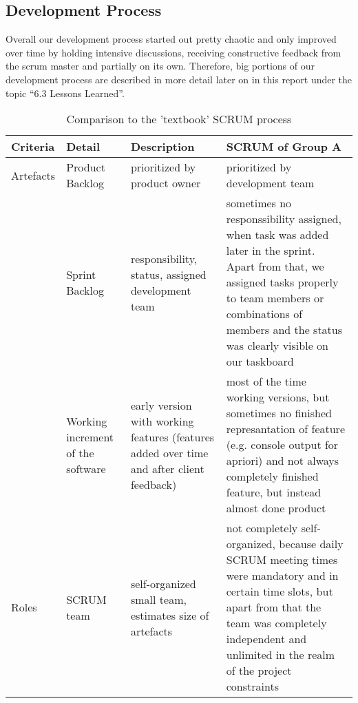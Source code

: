 
\subsection{Development Process}

Overall our development process started out pretty chaotic and only improved over time by holding intensive discussions, receiving constructive feedback from the scrum master and partially on its own. Therefore, big portions of our development process are described in more detail later on in this report under the topic “6.3 Lessons Learned”.

\begin{table}[!h]
  \caption{Comparison to the 'textbook' SCRUM process}
  \centering
  \begin{tabular}{|p{1.5cm}|p{2cm}|p{4cm}|p{4cm}|}
    Criteria & Detail & Description & SCRUM of Group A\\
    \hline
    \hline
    Artefacts & Product Backlog & prioritized by product owner & prioritized by development team \\
    \hline
      & Sprint Backlog & responsibility, status, assigned development team & sometimes no responssibility assigned, when task was added later in the sprint. Apart from that, we assigned tasks properly to team members or combinations of members and the status was clearly visible on our taskboard\\
    \hline
      & Working increment of the software & early version with working features (features added over time and after client feedback) & most of the time working versions, but sometimes no finished represantation of feature (e.g. console output for apriori) and not always completely finished feature, but instead almost done product \\
    \hline
    Roles & SCRUM team & self-organized small team, estimates size of artefacts & not completely self-organized, because daily SCRUM meeting times were mandatory and in certain time slots, but apart from that the team was completely independent and unlimited in the realm of the project constraints \\
    \hline
    \hline
  \end{tabular}
\end{table}    
